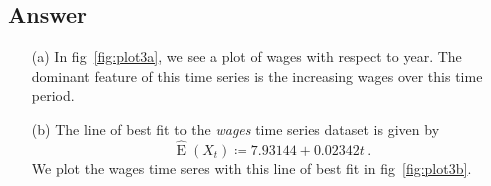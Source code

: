 \documentclass[10pt]{fphw}
\theoremstyle{definition}
\newcommand{\expect}{\operatorname{E}}
\begin{document}
\subsection*{Answer}

\begin{enumerate}
    \item[(a)] In fig~\ref{fig:plot3a}, we see a plot of wages with respect to year.
    The dominant feature of this time series is the increasing wages over this time period.
%   
    
    \item[(b)] The line of best fit to the \emph{wages} time series dataset is given by
    \begin{equation}
        \hat{\expect}(X_t) \coloneqq 7.93144 + 0.02342 t\,.
    \end{equation}    
    We plot the wages time seres with this line of best fit in fig~\ref{fig:plot3b}.
    

\end{enumerate}
\end{document}
